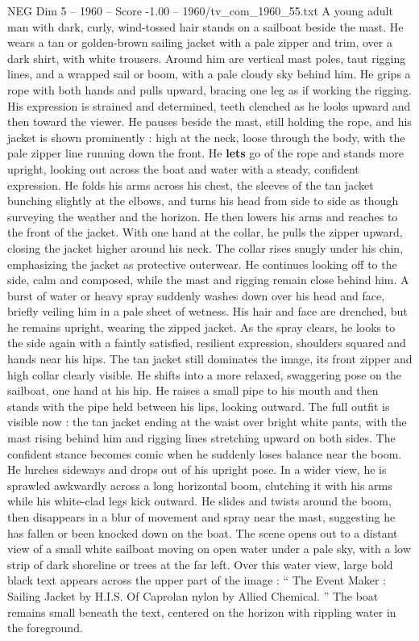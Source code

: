 \begin{textsample}{NEG Dim 5 – 1960 – Score -1.00 – 1960/tv\_com\_1960\_55.txt}  \label{ex:f5_neg_050}
A young adult man with dark, curly, wind-tossed hair stands on a sailboat beside the mast.
He wears a tan or golden-brown sailing jacket with a pale zipper and trim, over a dark shirt, with white trousers.
Around him are vertical mast poles, taut rigging lines, and a wrapped sail or boom, with a pale cloudy sky behind him.
He grips a rope with both hands and pulls upward, bracing one leg as if working the rigging.
His expression is strained and determined, teeth clenched as he looks upward and then toward the viewer.
He pauses beside the mast, still holding the rope, and his jacket is shown prominently : high at the neck, loose through the body, with the pale zipper line running down the front.
He \textbf{lets} go of the rope and stands more upright, looking out across the boat and water with a steady, confident expression.
He folds his arms across his chest, the sleeves of the tan jacket bunching slightly at the elbows, and turns his head from side to side as though surveying the weather and the horizon.
He then lowers his arms and reaches to the front of the jacket.
With one hand at the collar, he pulls the zipper upward, closing the jacket higher around his neck.
The collar rises snugly under his chin, emphasizing the jacket as protective outerwear.
He continues looking off to the side, calm and composed, while the mast and rigging remain close behind him.
A burst of water or heavy spray suddenly washes down over his head and face, briefly veiling him in a pale sheet of wetness.
His hair and face are drenched, but he remains upright, wearing the zipped jacket.
As the spray clears, he looks to the side again with a faintly satisfied, resilient expression, shoulders squared and hands near his hips.
The tan jacket still dominates the image, its front zipper and high collar clearly visible.
He shifts into a more relaxed, swaggering pose on the sailboat, one hand at his hip.
He raises a small pipe to his mouth and then stands with the pipe held between his lips, looking outward.
The full outfit is visible now : the tan jacket ending at the waist over bright white pants, with the mast rising behind him and rigging lines stretching upward on both sides.
The confident stance becomes comic when he suddenly loses balance near the boom.
He lurches sideways and drops out of his upright pose.
In a wider view, he is sprawled awkwardly across a long horizontal boom, clutching it with his arms while his white-clad legs kick outward.
He slides and twists around the boom, then disappears in a blur of movement and spray near the mast, suggesting he has fallen or been knocked down on the boat.
The scene opens out to a distant view of a small white sailboat moving on open water under a pale sky, with a low strip of dark shoreline or trees at the far left.
Over this water view, large bold black text appears across the upper part of the image : “ The Event Maker : Sailing Jacket by H.I.S.
Of Caprolan nylon by Allied Chemical. ” The boat remains small beneath the text, centered on the horizon with rippling water in the foreground.

\end{textsample}
